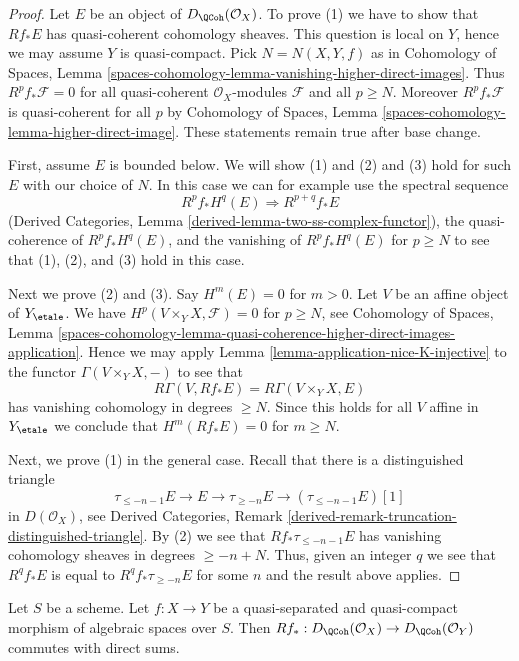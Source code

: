 \begin{proof}
Let $E$ be an object of $D_\QCoh(\mathcal{O}_X)$.
To prove (1) we have to show that $Rf_*E$ has quasi-coherent
cohomology sheaves. This question is local on $Y$, hence we may
assume $Y$ is quasi-compact. Pick $N = N(X, Y, f)$ as in
Cohomology of Spaces, Lemma
\ref{spaces-cohomology-lemma-vanishing-higher-direct-images}.
Thus $R^pf_*\mathcal{F} = 0$ for all quasi-coherent $\mathcal{O}_X$-modules
$\mathcal{F}$ and all $p \geq N$. Moreover $R^pf_*\mathcal{F}$
is quasi-coherent for all $p$ by
Cohomology of Spaces, Lemma \ref{spaces-cohomology-lemma-higher-direct-image}.
These statements remain true after base change.

\medskip\noindent
First, assume $E$ is bounded below. We will show (1) and (2) and (3) hold
for such $E$ with our choice of $N$. In this case we can for example use the
spectral sequence
$$
R^pf_*H^q(E) \Rightarrow R^{p + q}f_*E
$$
(Derived Categories, Lemma \ref{derived-lemma-two-ss-complex-functor}),
the quasi-coherence of $R^pf_*H^q(E)$, and the vanishing of $R^pf_*H^q(E)$
for $p \geq N$ to see that (1), (2), and (3) hold in this case.

\medskip\noindent
Next we prove (2) and (3). Say $H^m(E) = 0$ for $m > 0$.
Let $V$ be an affine object of $Y_\etale$.
We have $H^p(V \times_Y X, \mathcal{F}) = 0$ for $p \geq N$, see
Cohomology of Spaces, Lemma
\ref{spaces-cohomology-lemma-quasi-coherence-higher-direct-images-application}.
Hence we may apply Lemma \ref{lemma-application-nice-K-injective}
to the functor $\Gamma(V \times_Y X, -)$ to see that
$$
R\Gamma(V, Rf_*E) = R\Gamma(V \times_Y X, E)
$$
has vanishing cohomology in degrees $\geq N$. Since this holds for
all $V$ affine in $Y_\etale$ we conclude that $H^m(Rf_*E) = 0$
for $m \geq N$.

\medskip\noindent
Next, we prove (1) in the general case. Recall that there is a
distinguished triangle
$$
\tau_{\leq -n - 1}E \to E \to \tau_{\geq -n}E \to
(\tau_{\leq -n - 1}E)[1]
$$
in $D(\mathcal{O}_X)$, see Derived Categories, Remark
\ref{derived-remark-truncation-distinguished-triangle}.
By (2) we see that $Rf_*\tau_{\leq -n - 1}E$
has vanishing cohomology sheaves in degrees $\geq -n + N$.
Thus, given an integer $q$ we see that $R^qf_*E$ is equal
to $R^qf_*\tau_{\geq -n}E$ for some $n$ and the result
above applies.
\end{proof}

\begin{lemma}
\label{lemma-quasi-coherence-pushforward-direct-sums}
Let $S$ be a scheme. Let $f : X \to Y$ be a quasi-separated and
quasi-compact morphism of algebraic spaces over $S$. Then
$Rf_* : D_\QCoh(\mathcal{O}_X) \to D_\QCoh(\mathcal{O}_Y)$
commutes with direct sums.
\end{lemma}

